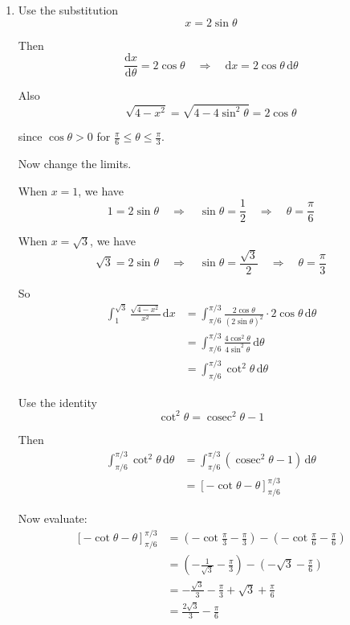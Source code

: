\documentclass[leqno]{article}
\begin{document}
\begin{enumerate}[
  label=\textbf{\arabic*.},
  leftmargin=*,
  topsep=0pt,
  partopsep=0pt,
  parsep=0pt
]
\begin{djsSolution}
\begin{enumerate}[label=\textbf{(\roman*)}]
\item Use the substitution
\[
x=2\sin\theta
\]

Then
\[
\frac{\mathrm{d}x}{\mathrm{d}\theta}=2\cos\theta
\quad\Longrightarrow\quad
\mathrm{d}x=2\cos\theta\,\mathrm{d}\theta
\]

Also
\[
\sqrt{4-x^2}=\sqrt{4-4\sin^2\theta}=2\cos\theta
\]

since $\cos\theta>0$ for $\frac{\pi}{6}\le\theta\le\frac{\pi}{3}$.

Now change the limits.

When $x=1$, we have
\[
1=2\sin\theta\quad\Longrightarrow\quad\sin\theta=\frac12\quad\Longrightarrow\quad\theta=\frac{\pi}{6}
\]

When $x=\sqrt3$, we have
\[
\sqrt3=2\sin\theta\quad\Longrightarrow\quad\sin\theta=\frac{\sqrt3}{2}\quad\Longrightarrow\quad\theta=\frac{\pi}{3}
\]

So
\begin{align*}
\int_1^{\sqrt3}\frac{\sqrt{4-x^2}}{x^2}\,\mathrm{d}x
&=\int_{\pi/6}^{\pi/3}\frac{2\cos\theta}{(2\sin\theta)^2}\cdot 2\cos\theta\,\mathrm{d}\theta\\
&=\int_{\pi/6}^{\pi/3}\frac{4\cos^2\theta}{4\sin^2\theta}\,\mathrm{d}\theta\\
&=\int_{\pi/6}^{\pi/3}\cot^2\theta\,\mathrm{d}\theta
\end{align*}

Use the identity
\[
\cot^2\theta=\operatorname{cosec}^2\theta-1
\]

Then
\begin{align*}
\int_{\pi/6}^{\pi/3}\cot^2\theta\,\mathrm{d}\theta
&=\int_{\pi/6}^{\pi/3}(\operatorname{cosec}^2\theta-1)\,\mathrm{d}\theta\\
&=\left[-\cot\theta-\theta\right]_{\pi/6}^{\pi/3}
\end{align*}

Now evaluate:
\begin{align*}
\left[-\cot\theta-\theta\right]_{\pi/6}^{\pi/3}
&=\left(-\cot\frac{\pi}{3}-\frac{\pi}{3}\right)-\left(-\cot\frac{\pi}{6}-\frac{\pi}{6}\right)\\
&=\left(-\frac{1}{\sqrt3}-\frac{\pi}{3}\right)-\left(-\sqrt3-\frac{\pi}{6}\right)\\
&=-\frac{\sqrt3}{3}-\frac{\pi}{3}+\sqrt3+\frac{\pi}{6}\\
&=\frac{2\sqrt3}{3}-\frac{\pi}{6}
\end{align*}
\end{enumerate}
\end{djsSolution}



\end{enumerate}
\end{document}
